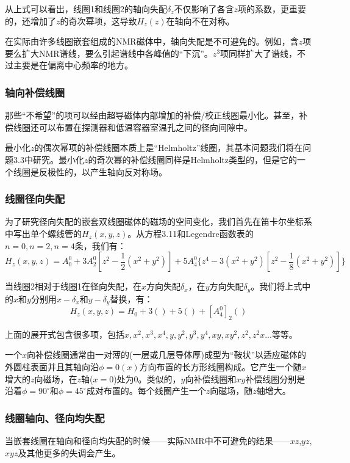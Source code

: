 从上式可以看出，线圈1和线圈2的轴向失配$\delta_z$不仅影响了各含$z$项的系数，更重要的，还增加了$z$的奇次幂项，这导致$H_z(z)$在轴向不在对称。

在实际由许多线圈嵌套组成的NMR磁体中，轴向失配是不可避免的。例如，含$z$项要么扩大NMR谱线，要么引起谱线中各峰值的“下沉”。$z^3$项同样扩大了谱线，不过主要是在偏离中心频率的地方。

\subsubsection{轴向补偿线圈}
那些“不希望”的项可以经由超导磁体内部增加的补偿/校正线圈最小化。甚至，补偿线圈还可以布置在探测器和低温容器室温孔之间的径向间隙中。

最小化$z$的偶次幂项的补偿线圈本质上是“Helmholtz”线圈，其基本问题我们将在问题3.3中研究。最小化$z$的奇次幂的补偿线圈同样是Helmholtz类型的，但是它的一个线圈是反极性的，以产生轴向反对称场。

\subsubsection{线圈径向失配}
为了研究径向失配的嵌套双线圈磁体的磁场的空间变化，我们首先在笛卡尔坐标系中写出单个螺线管的$H_z(x,y,z)$。从方程3.11和Legendre函数表的$n=0,n=2,n=4$条，我们有：
\begin{equation}
  H_z(x,y,z)=A_0^0+3A_2^0[z^2-\frac{1}{2}(x^2+y^2)]+5A_4^0\{z^4-3(x^2+y^2)[z^2-\frac{1}{8}(x^2+y^2)]\}
\end{equation}

当线圈2相对于线圈1在径向失配，在$x$方向失配$\delta_x$，在$y$方向失配$\delta_y$。我们将上式中的$x$和$y$分别用$x-\delta_x$和$y-\delta_y$替换，有：
\begin{equation*}
H_z(x,y,z)=H_0+3()+5()+[A_4^0]_2() \tag{3.33'}
\end{equation*}

上面的展开式包含很多项，包括$x,x^2,x^3,x^4,y,y^2,y^3,y^4,xy,xy^2,z^2,z^2x...$等等。

一个$x$向补偿线圈通常由一对薄的(一层或几层导体厚)成型为“鞍状”以适应磁体的外圆柱表面并且其轴向沿$\phi=0(x)$方向布置的长方形线圈构成。它产生一个随$x$增大的$z$向磁场，在$z$轴($x=0$)处为0。类似的，$y$向补偿线圈和$xy$补偿线圈分别是沿着$\phi=90^\circ$和$\phi=45^\circ$成对布置的。每个线圈产生一个$z$向磁场，随$z$轴增大。

\subsubsection{线圈轴向、径向均失配}
当嵌套线圈在轴向和径向均失配的时候——实际NMR中不可避免的结果——$xz$,$yz$,$xyz$及其他更多的失调会产生。


